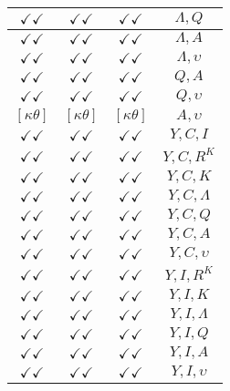 \documentclass[a4paper,10pt]{article}
\begin{document}
\begin{longtable}{|c|c|c|c|}
\hline
$\checkmark\checkmark$ & $\checkmark\checkmark$ & $\checkmark\checkmark$ & ${\Lambda},{Q}$ \\
\hline
$\checkmark\checkmark$ & $\checkmark\checkmark$ & $\checkmark\checkmark$ & ${\Lambda},{A}$ \\
\hline
$\checkmark\checkmark$ & $\checkmark\checkmark$ & $\checkmark\checkmark$ & ${\Lambda},{\upsilon}$ \\
\hline
$\checkmark\checkmark$ & $\checkmark\checkmark$ & $\checkmark\checkmark$ & ${Q},{A}$ \\
\hline
$\checkmark\checkmark$ & $\checkmark\checkmark$ & $\checkmark\checkmark$ & ${Q},{\upsilon}$ \\
\hline
$[\kappa \theta ]$ & $[\kappa \theta ]$ & $[\kappa \theta ]$ & ${A},{\upsilon}$ \\
\hline
$\checkmark\checkmark$ & $\checkmark\checkmark$ & $\checkmark\checkmark$ & ${Y},{C},{I}$ \\
\hline
$\checkmark\checkmark$ & $\checkmark\checkmark$ & $\checkmark\checkmark$ & ${Y},{C},{R^{K}}$ \\
\hline
$\checkmark\checkmark$ & $\checkmark\checkmark$ & $\checkmark\checkmark$ & ${Y},{C},{K}$ \\
\hline
$\checkmark\checkmark$ & $\checkmark\checkmark$ & $\checkmark\checkmark$ & ${Y},{C},{\Lambda}$ \\
\hline
$\checkmark\checkmark$ & $\checkmark\checkmark$ & $\checkmark\checkmark$ & ${Y},{C},{Q}$ \\
\hline
$\checkmark\checkmark$ & $\checkmark\checkmark$ & $\checkmark\checkmark$ & ${Y},{C},{A}$ \\
\hline
$\checkmark\checkmark$ & $\checkmark\checkmark$ & $\checkmark\checkmark$ & ${Y},{C},{\upsilon}$ \\
\hline
$\checkmark\checkmark$ & $\checkmark\checkmark$ & $\checkmark\checkmark$ & ${Y},{I},{R^{K}}$ \\
\hline
$\checkmark\checkmark$ & $\checkmark\checkmark$ & $\checkmark\checkmark$ & ${Y},{I},{K}$ \\
\hline
$\checkmark\checkmark$ & $\checkmark\checkmark$ & $\checkmark\checkmark$ & ${Y},{I},{\Lambda}$ \\
\hline
$\checkmark\checkmark$ & $\checkmark\checkmark$ & $\checkmark\checkmark$ & ${Y},{I},{Q}$ \\
\hline
$\checkmark\checkmark$ & $\checkmark\checkmark$ & $\checkmark\checkmark$ & ${Y},{I},{A}$ \\
\hline
$\checkmark\checkmark$ & $\checkmark\checkmark$ & $\checkmark\checkmark$ & ${Y},{I},{\upsilon}$ \\

\end{longtable}
\end{document}
